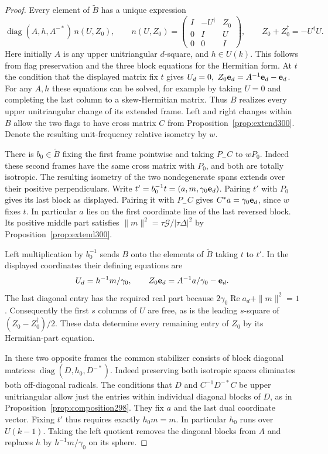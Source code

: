 \documentclass[a4paper,11pt]{article}
\theoremstyle{definition}
\theoremstyle{remark}
\numberwithin{equation}{section}
\begin{document}
\begin{proof}
Every element of \(\widetilde B\) has a unique expression
\[
 \operatorname{diag}(A,h,A^{-*})\,n(U,Z_0),\qquad
 n(U,Z_0)=
 \begin{pmatrix}I&-U^\dagger&Z_0\\0&I&U\\0&0&I\end{pmatrix},
 \qquad Z_0+Z_0^\dagger=-U^\dagger U .
\]
Here initially \(A\) is any upper unitriangular \(d\)-square,
and \(h\in U(k)\). This follows from flag preservation and
the three block equations for the Hermitian form. At \(t\)
the condition that the displayed matrix fix \(t\) gives
\(U_d=0,\ Z_0{\bf e}_d=A^{-1}{\bf e}_d-{\bf e}_d\).
For any \(A,h\) these equations can be solved, for example
by taking \(U=0\) and completing the last column to a
skew-Hermitian matrix. Thus \(B\) realizes every upper
unitriangular change of its extended frame. Left and right
changes within \(B\) allow the two flags to have cross
matrix \(C\) from Proposition~\ref{prop:extend300}. Denote
the resulting unit-frequency relative isometry by \(w\).

There is \(b_0\in\widetilde B\) fixing the first frame
pointwise and taking \(P_- C\) to \(wP_0\). Indeed these
second frames have the same cross matrix with \(P_0\),
and both are totally isotropic. The resulting isometry
of the two nondegenerate spans extends over their positive
perpendiculars. Write \(t'=b_0^{-1}t=(a,m,\gamma_0{\bf e}_d)\).
Pairing \(t'\) with \(P_0\) gives its last block as displayed.
Pairing it with \(P_-C\) gives \(C^*a=\gamma_0{\bf e}_d\),
since \(w\) fixes \(t\). In particular \(a\) lies on the
first coordinate line of the last reversed block. Its positive
middle part satisfies \(\|m\|^2=\tau\mathcal G/|\tau\Delta|^2\)
by Proposition~\ref{prop:extend300}.

Left multiplication by \(b_0^{-1}\) sends \(B\) onto the
elements of \(\widetilde B\) taking \(t\) to \(t'\).
In the displayed coordinates their defining equations are
\[
           U_d=h^{-1}m/\gamma_0,\qquad
           Z_0{\bf e}_d=A^{-1}a/\gamma_0-{\bf e}_d .
\]
The last diagonal entry has the required real part because
\(2\gamma_0\operatorname{Re}a_d+\|m\|^2=1\).
Consequently the first \(s\) columns of \(U\) are free,
as is the leading \(s\)-square of
\((Z_0-Z_0^\dagger)/2\). These data determine every remaining
entry of \(Z_0\) by its Hermitian-part equation.

In these two opposite frames the common stabilizer consists
of block diagonal matrices
\(\operatorname{diag}(D,h_0,D^{-*})\). Indeed preserving
both isotropic spaces eliminates both off-diagonal radicals.
The conditions that \(D\) and \(C^{-1}D^{-*}C\) be upper
unitriangular allow just the entries within individual
diagonal blocks of \(D\), as in
Proposition~\ref{prop:composition298}. They fix \(a\) and
the last dual coordinate vector. Fixing \(t'\) thus requires
exactly \(h_0m=m\). In particular \(h_0\) runs over \(U(k-1)\).
Taking the left quotient removes the diagonal blocks from
\(A\) and replaces \(h\) by \(h^{-1}m/\gamma_0\) on its sphere.


\end{proof}
\end{document}
